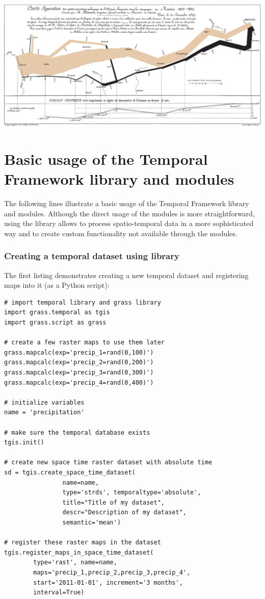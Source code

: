 \documentclass[a4paper,12pt,oneside]{book}
\newcommand{\tf}{Temporal Framework\xspace}
\begin{document}
\begin{center}
  \includegraphics[angle=90]{./images/Minard.png}
\end{center}


\chapter{Basic usage of the \tf library and modules}
\label{appdx:tfUsage}
The following lines illustrate a basic usage of the \tf library and modules.
Although the direct usage of the modules is more straightforward, using the library
allows to process spatio-temporal data in a more sophisticated way and to create
custom functionality not available through the modules.

\subsection*{Creating a temporal dataset using library}
The first listing demonstrates creating a new temporal dataset
and registering maps into it (as a Python script):

\begin{small}
\begin{lstlisting}[style=python]
# import temporal library and grass library
import grass.temporal as tgis
import grass.script as grass

# create a few raster maps to use them later
grass.mapcalc(exp='precip_1=rand(0,100)')
grass.mapcalc(exp='precip_2=rand(0,200)')
grass.mapcalc(exp='precip_3=rand(0,300)')
grass.mapcalc(exp='precip_4=rand(0,400)')

# initialize variables
name = 'precipitation'

# make sure the temporal database exists
tgis.init()

# create new space time raster dataset with absolute time
sd = tgis.create_space_time_dataset(
                name=name,
                type='strds', temporaltype='absolute',
                title="Title of my dataset",
                descr="Description of my dataset",
                semantic='mean')

# register these raster maps in the dataset
tgis.register_maps_in_space_time_dataset(
        type='rast', name=name,
        maps='precip_1,precip_2,precip_3,precip_4',
        start='2011-01-01', increment='3 months',
        interval=True)

\end{lstlisting}
\end{small}
\end{document}

